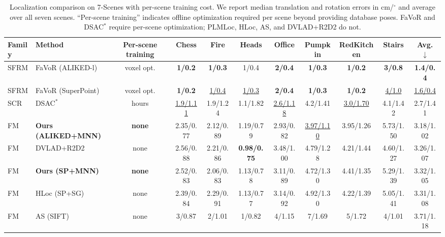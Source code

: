 \documentclass[letterpaper,10 pt,conference]{ieeeconf}
\newcommand{\method}{PLMLoc}
\begin{document}
\begin{table}[!t]
    \centering
    \caption{Localization comparison on 7-Scenes with per-scene training cost. We report median translation and rotation errors in cm/$^\circ$ and average over all seven scenes. ``Per-scene training'' indicates offline optimization required per scene beyond providing database poses. FaVoR and DSAC$^\ast$ require per-scene optimization; \method{}, HLoc, AS, and DVLAD+R2D2 do not.}
    \label{tab:seven-scenes-results}
    \setlength{\tabcolsep}{2.4pt}
    \begin{adjustbox}{max width=\textwidth}
    \begin{tabular}{@{}llccccccccc@{}}
        \toprule
        Family & Method & Per-scene training & Chess & Fire & Heads & Office & Pumpkin & RedKitchen & Stairs & Avg. $\downarrow$ \\
        \midrule
        SFRM & FaVoR (ALIKED-l)~\cite{polizzi2025favor} & voxel opt. & \textbf{1/0.2} & \textbf{1/0.3} & 1/0.4 & \textbf{2/0.4} & \textbf{1/0.3} & \textbf{1/0.2} & \textbf{3/0.8} & \textbf{1.4/0.4} \\
        SFRM & FaVoR (SuperPoint)~\cite{polizzi2025favor} & voxel opt. & \textbf{1/0.2} & \underline{1/0.4} & \underline{1/0.3} & \textbf{2/0.4} & \textbf{1/0.3} & \textbf{1/0.2} & \underline{4/1.0} & \underline{1.6/0.4} \\
        \midrule
        SCR & DSAC$^\ast$~\cite{brachmann2021dsacstar} & hours & \underline{1.9/1.11} & 1.9/1.24 & 1.1/1.82 & \underline{2.6/1.18} & 4.2/1.41 & \underline{3.0/1.70} & 4.1/1.42 & 2.7/1.41 \\
        \midrule
        FM & \textbf{Ours (ALIKED+MNN)} & \textbf{none} & 2.35/0.77 & 2.12/0.89 & 1.19/0.79 & 2.93/0.82 & \underline{3.97/1.10} & 3.95/1.26 & 5.73/1.50 & 3.18/1.02 \\
        FM & DVLAD+R2D2~\cite{revaud2019r2d2} & none & 2.56/0.88 & 2.21/0.86 & \textbf{0.98/0.75} & 3.48/1.00 & 4.79/1.28 & 4.21/1.44 & 4.60/1.27 & 3.26/1.07 \\
        FM & \textbf{Ours (SP+MNN)} & \textbf{none} & 2.52/0.83 & 2.06/0.83 & 1.13/0.78 & 3.11/0.89 & 4.72/1.30 & 4.41/1.35 & 5.29/1.39 & 3.32/1.05 \\
        FM & HLoc (SP+SG)~\cite{sarlin2019hloc,sarlin2020superglue} & none & 2.39/0.84 & 2.29/0.91 & 1.13/0.77 & 3.14/0.92 & 4.92/1.30 & 4.22/1.39 & 5.05/1.41 & 3.31/1.08 \\
        FM & AS (SIFT)~\cite{sattler2012active} & none & 3/0.87 & 2/1.01 & 1/0.82 & 4/1.15 & 7/1.69 & 5/1.72 & 4/1.01 & 3.71/1.18 \\
        \bottomrule
    \end{tabular}
    \end{adjustbox}
\end{table}
\end{document}
